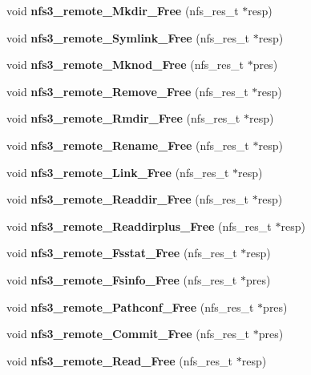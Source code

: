 \begin{CompactItemize}
\item 
void {\bf nfs3\_\-remote\_\-Mkdir\_\-Free} (nfs\_\-res\_\-t $\ast$resp)
\item 
void {\bf nfs3\_\-remote\_\-Symlink\_\-Free} (nfs\_\-res\_\-t $\ast$resp)
\item 
void {\bf nfs3\_\-remote\_\-Mknod\_\-Free} (nfs\_\-res\_\-t $\ast$pres)
\item 
void {\bf nfs3\_\-remote\_\-Remove\_\-Free} (nfs\_\-res\_\-t $\ast$resp)
\item 
void {\bf nfs3\_\-remote\_\-Rmdir\_\-Free} (nfs\_\-res\_\-t $\ast$resp)
\item 
void {\bf nfs3\_\-remote\_\-Rename\_\-Free} (nfs\_\-res\_\-t $\ast$resp)
\item 
void {\bf nfs3\_\-remote\_\-Link\_\-Free} (nfs\_\-res\_\-t $\ast$resp)
\item 
void {\bf nfs3\_\-remote\_\-Readdir\_\-Free} (nfs\_\-res\_\-t $\ast$resp)
\item 
void {\bf nfs3\_\-remote\_\-Readdirplus\_\-Free} (nfs\_\-res\_\-t $\ast$resp)
\item 
void {\bf nfs3\_\-remote\_\-Fsstat\_\-Free} (nfs\_\-res\_\-t $\ast$resp)
\item 
void {\bf nfs3\_\-remote\_\-Fsinfo\_\-Free} (nfs\_\-res\_\-t $\ast$pres)
\item 
void {\bf nfs3\_\-remote\_\-Pathconf\_\-Free} (nfs\_\-res\_\-t $\ast$pres)
\item 
void {\bf nfs3\_\-remote\_\-Commit\_\-Free} (nfs\_\-res\_\-t $\ast$pres)
\item 
void {\bf nfs3\_\-remote\_\-Read\_\-Free} (nfs\_\-res\_\-t $\ast$resp)
\end{CompactItemize}

